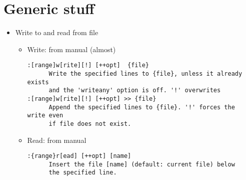 \documentclass[a4paper,12pt,%
              final%
              ]{article}
\begin{document}
\section{Generic stuff}
\begin{itemize}
  \item Write to and read from file
    \begin{itemize}
      \item Write: from manual (almost)
\begin{verbatim}
:[range]w[rite][!] [++opt]  {file}
      Write the specified lines to {file}, unless it already exists
      and the 'writeany' option is off. '!' overwrites
:[range]w[rite][!] [++opt] >> {file}
      Append the specified lines to {file}. '!' forces the write even
      if file does not exist.
\end{verbatim}
      \item Read: from manual
\begin{verbatim}
:{range}r[ead] [++opt] [name]
      Insert the file [name] (default: current file) below
      the specified line.


\end{verbatim}
\end{itemize}
\end{itemize}
\end{document}
